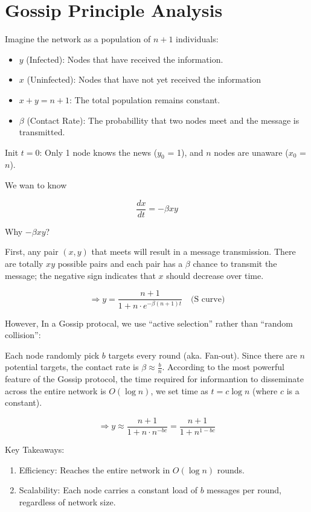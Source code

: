 \documentclass[12pt,a4paper]{article}
\begin{document}
\section*{Gossip Principle Analysis}

Imagine the network as a population of $n+1$ individuals:
\begin{itemize}
    \item $y$ (Infected): Nodes that have received the information.
    \item $x$ (Uninfected): Nodes that have not yet received the information
    \item $x + y = n + 1$: The total population remains constant.
    \item $\beta$ (Contact Rate): The probabillity that two nodes meet and the message is transmitted.
\end{itemize}

Init $t = 0$: Only 1 node knows the news ($y_0$ = 1), and $n$ nodes are unaware ($x_0$ = $n$).

We wan to know

\[\frac{dx}{dt} = -\beta xy\]

Why $-\beta xy$?

First, any pair $(x, y)$ that meets will result in a message transmission. 
There are totally $xy$ possible pairs and each pair has a $\beta$ chance to transmit the message; 
the negative sign indicates that $x$ should decrease over time.

\[\Rightarrow y = \frac{n+1}{1 + n \cdot e^{-\beta(n+1)t}} \quad \text{(S curve)}\]

However, In a Gossip protocal, we use ``active selection'' rather than ``random collision'':

Each node randomly pick $b$ targets every round (aka. Fan-out). Since there are $n$ potential targets, the contact rate is $\beta \approx \frac{b}{n}$. 
According to the most powerful feature of the Gossip protocol, the time required for informantion to disseminate across the entire network is $O(\log n)$, 
we set time as $t = c\log n$ (where $c$ is a constant).

\[\Rightarrow y \approx \frac{n+1}{1 + n \cdot n^{-bc}} = \frac{n+1}{1 + n^{1-bc}}\]


Key Takeaways:

\begin{enumerate}
    \item Efficiency: Reaches the entire network in $O(\log n)$ rounds.
    \item Scalability: Each node carries a constant load of $b$ messages per round, regardless of network size.
\end{enumerate}
\end{document}
